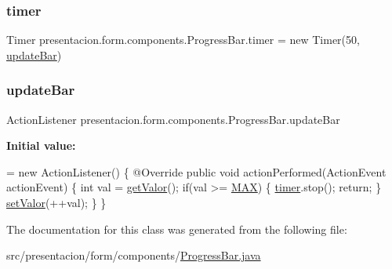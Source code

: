 \mbox{\label{classpresentacion_1_1form_1_1components_1_1ProgressBar_a6be2ec470ec1683c37b1d6c44c3981ca}} 
\subsubsection{\texorpdfstring{timer}{timer}}
{\footnotesize\ttfamily Timer presentacion.\+form.\+components.\+Progress\+Bar.\+timer = new Timer(50, \hyperlink{classpresentacion_1_1form_1_1components_1_1ProgressBar_a9adac61cfc9de30406abd2bdce99b897}{update\+Bar})\hspace{0.3cm}{\ttfamily [private]}}

\mbox{\label{classpresentacion_1_1form_1_1components_1_1ProgressBar_a9adac61cfc9de30406abd2bdce99b897}} 
\subsubsection{\texorpdfstring{update\+Bar}{updateBar}}
{\footnotesize\ttfamily Action\+Listener presentacion.\+form.\+components.\+Progress\+Bar.\+update\+Bar\hspace{0.3cm}{\ttfamily [private]}}

{\bfseries Initial value\+:}
\begin{DoxyCode}
= \textcolor{keyword}{new} ActionListener() \{
        @Override
        \textcolor{keyword}{public} \textcolor{keywordtype}{void} actionPerformed(ActionEvent actionEvent) \{
            \textcolor{keywordtype}{int} val = \hyperlink{classpresentacion_1_1form_1_1components_1_1ProgressBar_ad4a771a1e071efde0956a8984ad91eb1}{getValor}();
            \textcolor{keywordflow}{if}(val >= \hyperlink{classpresentacion_1_1form_1_1components_1_1ProgressBar_a3f6a2544b74d1b12812202c794bd0495}{MAX})
            \{
                \hyperlink{classpresentacion_1_1form_1_1components_1_1ProgressBar_a6be2ec470ec1683c37b1d6c44c3981ca}{timer}.stop();
                \textcolor{keywordflow}{return};
            \}
            \hyperlink{classpresentacion_1_1form_1_1components_1_1ProgressBar_af0d9d64e51ca6cf141e76ecfa189de29}{setValor}(++val);
        \}
    \}
\end{DoxyCode}


The documentation for this class was generated from the following file\+:\begin{DoxyCompactItemize}
\item 
src/presentacion/form/components/\hyperlink{ProgressBar_8java}{Progress\+Bar.\+java}\end{DoxyCompactItemize}
